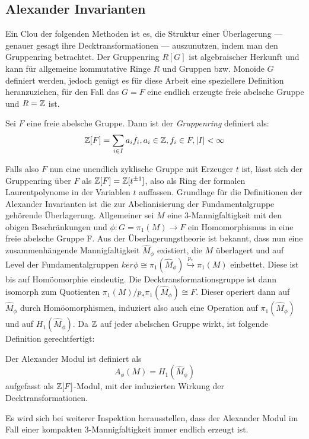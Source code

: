    \subsection{Alexander Invarianten}
    	Ein Clou der folgenden Methoden ist es, die Struktur einer Überlagerung --- genauer gesagt ihre Decktransformationen --- auszunutzen, indem man den Gruppenring betrachtet. Der Gruppenring $R[G]$ ist algebraischer Herkunft und kann für allgemeine kommutative Ringe $R$ und Gruppen bzw. Monoide $G$ definiert werden, jedoch genügt es für diese Arbeit eine speziellere Definition heranzuziehen, für den Fall das $G=F$ eine endlich erzeugte freie abelsche Gruppe und $R=\mathbb{Z}$ ist.
    	\begin{defn}[Gruppenring]
    		Sei $F$ eine freie abelsche Gruppe. Dann ist der \textit{Gruppenring} definiert als:
    		\[
    			\mathbb{Z}[F] = \sum_{i \in I} a_i f_i, a_i \in \mathbb{Z}, f_i \in F, |I| < \infty
    		\]
    	\end{defn}
        \label{wirkung:gruppenring}
    	Falls also $F$ nun eine unendlich zyklische Gruppe mit Erzeuger $t$ ist, lässt sich der Gruppenring über $F$ als $\mathbb{Z}[F] = \mathbb{Z}[t^{\pm 1}]$, also als Ring der formalen Laurentpolynome in der Variablen $t$ auffassen. 
    	Grundlage für die Definitionen der Alexander Invarianten ist die zur Abelianisierung der Fundamentalgruppe gehörende Überlagerung. Allgemeiner sei $M$ eine 3-Mannigfaltigkeit mit den obigen Beschränkungen und $\phi: G=\pi_1(M) \to F$ ein Homomorphismus in eine freie abelsche Gruppe F. Aus der Überlagerungstheorie ist bekannt, dass nun eine zusammenhängende Mannigfaltigkeit $\hat M_\phi$ existiert, die $M$ überlagert und auf Level der Fundamentalgruppen $ker \phi \cong \pi_1 (\hat M_\phi) \stackrel{p_*}{\hookrightarrow} \pi_1(M)$ einbettet. Diese ist bis auf Homöomorphie eindeutig. Die Decktransformationsgruppe ist dann isomorph zum Quotienten $\pi_1(M)/p_*\pi_1(\hat M_\phi) \cong F$. Dieser operiert dann auf $\hat M_\phi$ durch Homöomorphismen, induziert also auch eine Operation auf $\pi_1(\hat M_\phi)$ und auf $H_1(\hat M_\phi)$. Da $\mathbb{Z}$ auf jeder abelschen Gruppe wirkt, ist folgende Definition gerechtfertigt:
    	\begin{defn}
    		Der Alexander Modul ist definiert als
    		\[
    			A_\phi(M) = H_1(\hat M_\phi)
    		\]
    		aufgefasst als $\mathbb{Z}[F]$-Modul, mit der induzierten Wirkung der Decktransformationen.
    	\end{defn}
    	Es wird sich bei weiterer Inspektion herausstellen, dass der Alexander Modul im Fall einer kompakten 3-Mannigfaltigkeit immer endlich erzeugt ist. 
